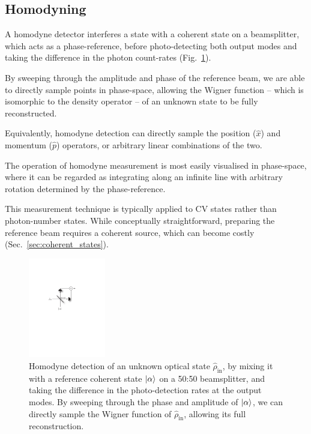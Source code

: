 \subsection{Homodyning} \label{sec:homodyne} 

A homodyne detector interferes a state with a coherent state on a beamsplitter, which acts as a phase-reference, before photo-detecting both output modes and taking the difference in the photon count-rates (Fig.~\ref{fig:homodyne}).

By sweeping through the amplitude and phase of the reference beam, we are able to directly sample points in phase-space, allowing the Wigner function -- which is isomorphic to the density operator -- of an unknown state to be fully reconstructed.

Equivalently, homodyne detection can directly sample the position ($\hat x$) and momentum ($\hat p$) operators, or arbitrary linear combinations of the two. 

The operation of homodyne measurement is most easily visualised in phase-space, where it can be regarded as integrating along an infinite line with arbitrary rotation determined by the phase-reference.

This measurement technique is typically applied to CV states rather than photon-number states. While conceptually straightforward, preparing the reference beam requires a coherent source, which can become costly (Sec.~\ref{sec:coherent_states}).

\begin{figure}[!htbp]
\includegraphics[width=0.3\textwidth]{homodyne}
\caption{Homodyne detection of an unknown optical state $\hat\rho_\mathrm{in}$, by mixing it with a reference coherent state $|\alpha\rangle$ on a 50:50 beamsplitter, and taking the difference in the photo-detection rates at the output modes. By sweeping through the phase and amplitude of $|\alpha\rangle$, we can directly sample the Wigner function of $\hat\rho_\mathrm{in}$, allowing its full reconstruction.} \label{fig:homodyne}
\end{figure}

